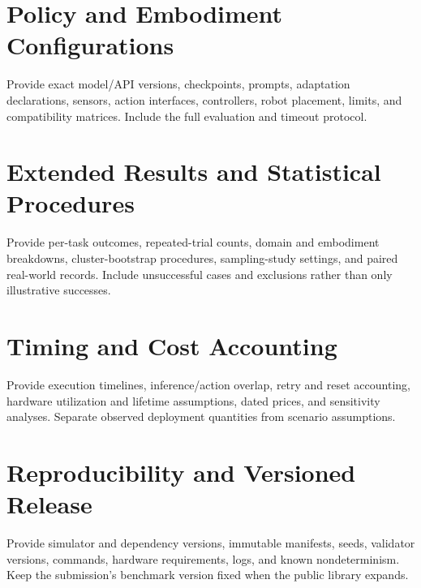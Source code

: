 \section{Policy and Embodiment Configurations}
Provide exact model/API versions, checkpoints, prompts, adaptation declarations, sensors, action interfaces, controllers, robot placement, limits, and compatibility matrices. Include the full evaluation and timeout protocol.

\section{Extended Results and Statistical Procedures}
Provide per-task outcomes, repeated-trial counts, domain and embodiment breakdowns, cluster-bootstrap procedures, sampling-study settings, and paired real-world records. Include unsuccessful cases and exclusions rather than only illustrative successes.

\section{Timing and Cost Accounting}
Provide execution timelines, inference/action overlap, retry and reset accounting, hardware utilization and lifetime assumptions, dated prices, and sensitivity analyses. Separate observed deployment quantities from scenario assumptions.

\section{Reproducibility and Versioned Release}
Provide simulator and dependency versions, immutable manifests, seeds, validator versions, commands, hardware requirements, logs, and known nondeterminism. Keep the submission's benchmark version fixed when the public library expands.
